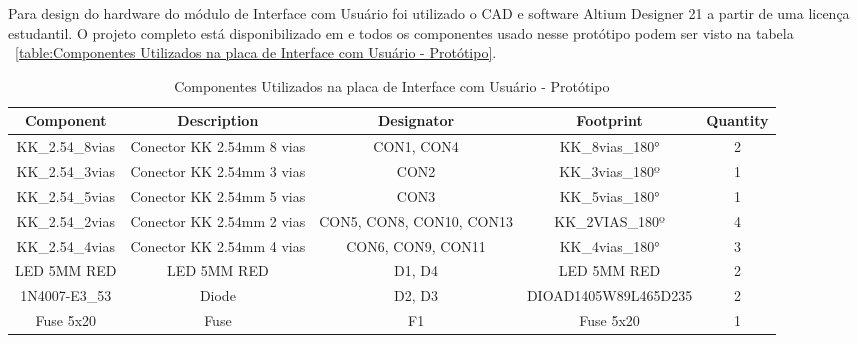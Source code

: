 \documentclass[../poliXuniversity_hospital_-USP-report.tex]{subfiles}
\begin{document}
Para design do hardware do módulo de Interface com Usuário foi utilizado o CAD e software Altium Designer 21 \cite{altium21} a partir de uma licença estudantil. O projeto completo está disponibilizado em \cite{github_modulos} e todos os componentes usado nesse protótipo podem ser visto na tabela ~\ref{table:Componentes Utilizados na placa de Interface com Usuário - Protótipo}.

\begin{table}[!ht]
\caption{Componentes Utilizados na placa de Interface com Usuário - Protótipo}
\centering
\begin{adjustbox}{width=\columnwidth,center}
\begin{tabular}{|c|c|c|c|c|}
\hline
Component                   & Description                                    & Designator                             & Footprint                   & Quantity \\ \hline
KK\_2.54\_8vias             & Conector KK 2.54mm 8   vias                    & CON1, CON4                             & KK\_8vias\_180°             & 2        \\ \hline
KK\_2.54\_3vias             & Conector KK 2.54mm 3   vias                    & CON2                                   & KK\_3vias\_180º             & 1        \\ \hline
KK\_2.54\_5vias             & Conector KK 2.54mm 5   vias                    & CON3                                   & KK\_5vias\_180°             & 1        \\ \hline
KK\_2.54\_2vias             & Conector KK 2.54mm 2   vias                    & CON5, CON8, CON10,   CON13             & KK\_2VIAS\_180º             & 4        \\ \hline
KK\_2.54\_4vias             & Conector KK 2.54mm 4   vias                    & CON6, CON9, CON11                      & KK\_4vias\_180°             & 3        \\ \hline
LED 5MM RED                 & LED 5MM RED                                    & D1, D4                                 & LED 5MM RED                 & 2        \\ \hline
1N4007-E3\_53               & Diode                                          & D2, D3                                 & DIOAD1405W89L465D235        & 2        \\ \hline
Fuse 5x20                   & Fuse                                           & F1                                     & Fuse 5x20                   & 1        \\ \hline

\end{tabular}
\end{adjustbox}
\end{table}
\end{document}
